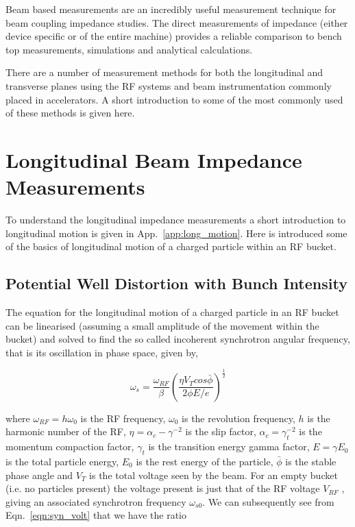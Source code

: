 Beam based measurements are an incredibly useful measurement technique for beam coupling impedance studies. The direct measurements of impedance (either device specific or of the entire machine) provides a reliable comparison to bench top measurements, simulations and analytical calculations. 

There are a number of measurement methods for both the longitudinal and transverse planes using the RF systems and beam instrumentation commonly placed in accelerators. A short introduction to some of the most commonly used of these methods is given here.

\section{Longitudinal Beam Impedance Measurements}

To understand the longitudinal impedance measurements a short introduction to longitudinal motion is given in App.~\ref{app:long_motion}. Here is introduced some of the basics of longitudinal motion of a charged particle within an RF bucket.

\subsection{Potential Well Distortion with Bunch Intensity}
\label{sec:pot-well-dist}

The equation for the longitudinal motion of a charged particle in an RF bucket can be linearised (assuming a small amplitude of the movement within the bucket) and solved to find the so called incoherent synchrotron angular frequency, that is its oscillation in phase space, given by,

\begin{equation}
\omega_{s} = \frac{\omega_{RF}}{\beta} \left( \frac{\eta V_{T}cos\bar{\phi}}{2\phi E/e}  \right)^{\frac{1}{2}}
\label{eqn:syn_volt}
\end{equation}

where $\omega_{RF} = h\omega_{0}$ is the RF frequency, $\omega_{0}$ is the revolution frequency, $h$ is the harmonic
number of the RF, $\eta = \alpha_{c} - \gamma^{-2}$ is the slip factor, $\alpha_{c} = \gamma_{t}^{-2}$ is the momentum compaction factor, $\gamma_{t}$ is the transition energy gamma factor, $E=\gamma E_{0}$ is the total particle energy, $E_{0}$ is the rest energy of the particle, $\bar{\phi}$ is the stable phase angle and $V_{T}$ is the total voltage seen by the beam. For an empty bucket (i.e. no particles present) the voltage present is just that of the RF voltage $V_{RF}$ , giving an associated synchrotron frequency $\omega_{s0}$. We can subsequently see from Eqn.~\ref{eqn:syn_volt} that we have the ratio

